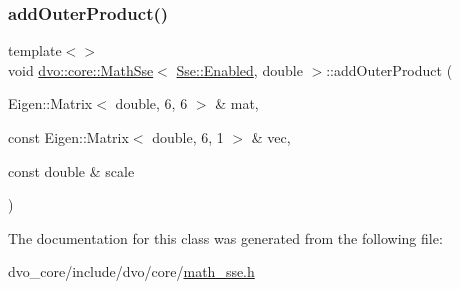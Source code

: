 \mbox{\label{classdvo_1_1core_1_1_math_sse_a8403622e21ba348610e4ca96d7c1915c}} 
\subsubsection{\texorpdfstring{add\+Outer\+Product()}{addOuterProduct()}\hspace{0.1cm}{\footnotesize\ttfamily [5/5]}}
{\footnotesize\ttfamily template$<$$>$ \\
void \mbox{\hyperlink{classdvo_1_1core_1_1_math_sse}{dvo\+::core\+::\+Math\+Sse}}$<$ \mbox{\hyperlink{structdvo_1_1core_1_1_sse_a4fd9b55a1ec035f837cc78f33d45a9adadefbacd4d80d2e8ba64c1583a4fda95a}{Sse\+::\+Enabled}}, double $>$\+::add\+Outer\+Product (\begin{DoxyParamCaption}\item[{Eigen\+::\+Matrix$<$ double, 6, 6 $>$ \&}]{mat,  }\item[{const Eigen\+::\+Matrix$<$ double, 6, 1 $>$ \&}]{vec,  }\item[{const double \&}]{scale }\end{DoxyParamCaption})}



The documentation for this class was generated from the following file\+:\begin{DoxyCompactItemize}
\item 
dvo\+\_\+core/include/dvo/core/\mbox{\hyperlink{math__sse_8h}{math\+\_\+sse.\+h}}\end{DoxyCompactItemize}
